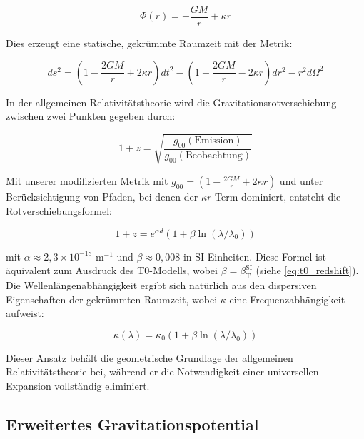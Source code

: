 \documentclass[12pt,a4paper]{article}
\newcommand{\betaT}{\beta_{\text{T}}}
\begin{document}
	\begin{equation}
		\Phi(r) = -\frac{GM}{r} + \kappa r
	\end{equation}
	
	Dies erzeugt eine statische, gekrümmte Raumzeit mit der Metrik\cite{pascher_galaxies_2025}:
	
	\begin{equation}
		\label{eq:modified_metric}
		ds^2 = (1 - \frac{2GM}{r} + 2\kappa r)dt^2 - (1 + \frac{2GM}{r} - 2\kappa r)dr^2 - r^2d\Omega^2
	\end{equation}
	
	In der allgemeinen Relativitätstheorie wird die Gravitationsrotverschiebung zwischen zwei Punkten gegeben durch\cite{weinberg1972}:
	
	\begin{equation}
		\label{eq:grav_redshift}
		1 + z = \sqrt{\frac{g_{00}(\text{Emission})}{g_{00}(\text{Beobachtung})}}
	\end{equation}
	
	Mit unserer modifizierten Metrik mit $g_{00} = (1 - \frac{2GM}{r} + 2\kappa r)$ und unter Berücksichtigung von Pfaden, bei denen der $\kappa r$-Term dominiert, entsteht die Rotverschiebungsformel\cite{pascher_messdifferenzen_2025}:
	
	\begin{equation}
		\label{eq:extended_redshift}
		1 + z = e^{\alpha d}(1 + \beta \ln(\lambda/\lambda_0))
	\end{equation}
	
	mit $\alpha \approx 2,3\times10^{-18}$ m$^{-1}$ und $\beta \approx 0,008$ in SI-Einheiten. Diese Formel ist äquivalent zum Ausdruck des T0-Modells, wobei $\beta = \betaT^{\text{SI}}$ (siehe \cref{eq:t0_redshift}). Die Wellenlängenabhängigkeit ergibt sich natürlich aus den dispersiven Eigenschaften der gekrümmten Raumzeit, wobei $\kappa$ eine Frequenzabhängigkeit aufweist\cite{pascher_temp_2025}:
	
	\begin{equation}
		\label{eq:kappa_wavelength}
		\kappa(\lambda) = \kappa_0(1 + \beta \ln(\lambda/\lambda_0))
	\end{equation}
	
	Dieser Ansatz behält die geometrische Grundlage der allgemeinen Relativitätstheorie bei, während er die Notwendigkeit einer universellen Expansion vollständig eliminiert.
	
	\subsection{Erweitertes Gravitationspotential}
	\label{sec:extended_gravity}
	
\end{document}
